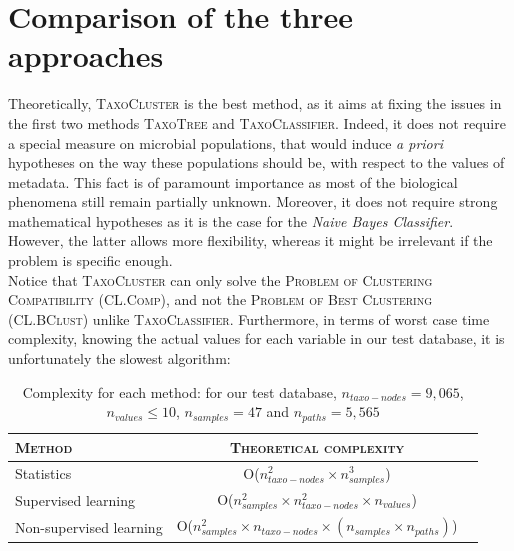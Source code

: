 \documentclass{report}
\begin{document}

\newpage

\chapter{Comparison of the three approaches}

Theoretically, \textsc{TaxoCluster} is the best method, as it aims at fixing the issues in the first two methods \textsc{TaxoTree} and \textsc{TaxoClassifier}. Indeed, it does not require a special measure on microbial populations, that would induce \emph{a priori} hypotheses on the way these populations should be, with respect to the values of metadata. This fact is of paramount importance as most of the biological phenomena still remain partially unknown. Moreover, it does not require strong mathematical hypotheses as it is the case for the \emph{Naive Bayes Classifier}. However, the latter allows more flexibility, whereas it might be irrelevant if the problem is specific enough.\\

Notice that \textsc{TaxoCluster} can only solve the \textsc{Problem of Clustering Compatibility (CL.Comp)}, and not the \textsc{Problem of Best Clustering (CL.BClust)} unlike \textsc{TaxoClassifier}. Furthermore, in terms of worst case time complexity, knowing the actual values for each variable in our test database, it is unfortunately the slowest algorithm:\\

    \begin{table}
      \caption{Complexity for each method: for our test database, $n_{taxo-nodes} = 9,065$, $n_{values} \le 10$, $n_{samples} = 47$ and $n_{paths} = 5,565$}
      \begin{tabular}{|l|c|r|}
        \hline
        \textsc{Method} & \textsc{Theoretical complexity} \\
        \hline
        Statistics & O($n_{taxo-nodes}^{2} \times n_{samples}^{3}$)\\
        \hline
        Supervised learning & O($n_{samples}^{2} \times n_{taxo-nodes}^{2} \times n_{values}$)\\
        \hline
        Non-supervised learning & O($n_{samples}^{2} \times n_{taxo-nodes}\times (n_{samples} \times n_{paths})$)\\
        \hline
      \end{tabular}
    \end{table}
\end{document}
